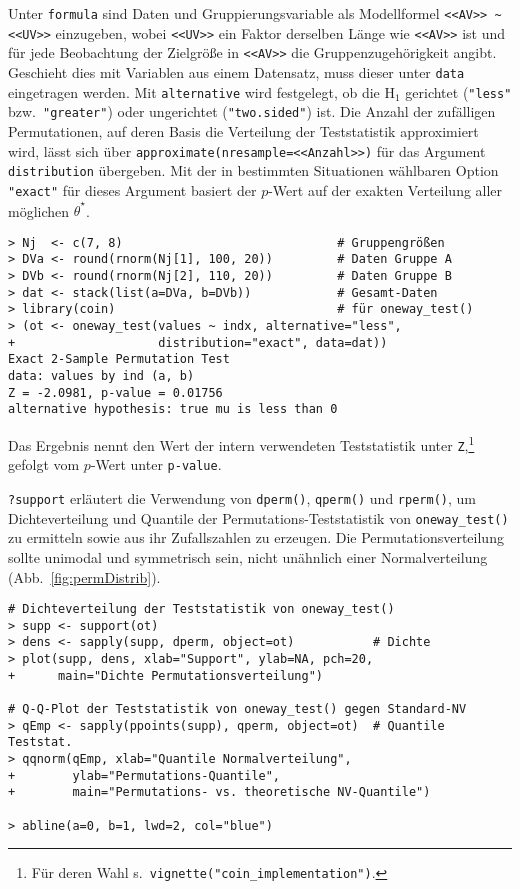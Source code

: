 Unter \lstinline!formula! sind Daten und Gruppierungsvariable als Modellformel \lstinline!<<AV>> ~ <<UV>>! einzugeben, wobei \lstinline!<<UV>>! ein Faktor derselben Länge wie \lstinline!<<AV>>! ist und für jede Beobachtung der Zielgröße in \lstinline!<<AV>>! die Gruppenzugehörigkeit angibt. Geschieht dies mit Variablen aus einem Datensatz, muss dieser unter \lstinline!data! eingetragen werden. Mit \lstinline!alternative! wird festgelegt, ob die $\text{H}_{1}$ gerichtet (\lstinline!"less"! bzw.\ \lstinline!"greater"!) oder ungerichtet (\lstinline!"two.sided"!) ist. Die Anzahl der zufälligen Permutationen, auf deren Basis die Verteilung der Teststatistik approximiert wird, lässt sich über \lstinline!approximate(nresample=<<Anzahl>>)! für das Argument \lstinline!distribution! übergeben. Mit der in bestimmten Situationen wählbaren Option \lstinline!"exact"! für dieses Argument basiert der $p$-Wert auf der exakten Verteilung aller möglichen $\hat{\theta}^{\star}$.
\begin{lstlisting}
> Nj  <- c(7, 8)                              # Gruppengrößen
> DVa <- round(rnorm(Nj[1], 100, 20))         # Daten Gruppe A
> DVb <- round(rnorm(Nj[2], 110, 20))         # Daten Gruppe B
> dat <- stack(list(a=DVa, b=DVb))            # Gesamt-Daten
> library(coin)                               # für oneway_test()
> (ot <- oneway_test(values ~ indx, alternative="less",
+                    distribution="exact", data=dat))
Exact 2-Sample Permutation Test
data: values by ind (a, b)
Z = -2.0981, p-value = 0.01756
alternative hypothesis: true mu is less than 0
\end{lstlisting}

Das Ergebnis nennt den Wert der intern verwendeten Teststatistik unter \lstinline!Z!,\footnote{Für deren Wahl s.\ \lstinline!vignette("coin_implementation")!.} gefolgt vom $p$-Wert unter \lstinline!p-value!.

\lstinline!?support! erläutert die Verwendung von \lstinline!dperm()!, \lstinline!qperm()! und \lstinline!rperm()!, um Dichteverteilung und Quantile der Permutations-Teststatistik von \lstinline!oneway_test()! zu ermitteln sowie aus ihr Zufallszahlen zu erzeugen. Die Permutationsverteilung sollte unimodal und symmetrisch sein, nicht unähnlich einer Normalverteilung (Abb.\ \ref{fig:permDistrib}).
\begin{lstlisting}
# Dichteverteilung der Teststatistik von oneway_test()
> supp <- support(ot)
> dens <- sapply(supp, dperm, object=ot)           # Dichte
> plot(supp, dens, xlab="Support", ylab=NA, pch=20,
+      main="Dichte Permutationsverteilung")

# Q-Q-Plot der Teststatistik von oneway_test() gegen Standard-NV
> qEmp <- sapply(ppoints(supp), qperm, object=ot)  # Quantile Teststat.
> qqnorm(qEmp, xlab="Quantile Normalverteilung",
+        ylab="Permutations-Quantile",
+        main="Permutations- vs. theoretische NV-Quantile")

> abline(a=0, b=1, lwd=2, col="blue")
\end{lstlisting}

